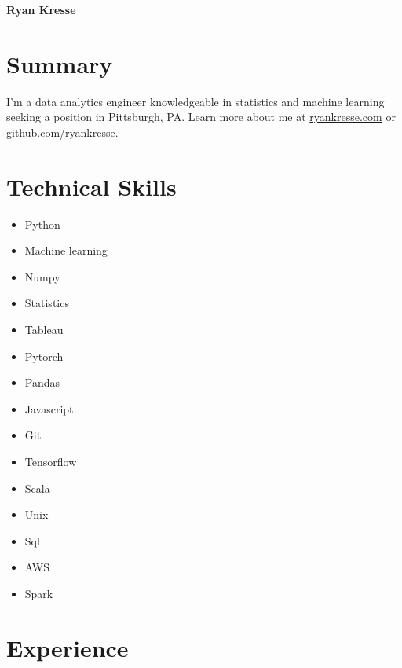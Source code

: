 \documentclass[11pt]{article}
\begin{document}
	\noindent \textbf{{\fontsize{38pt}{\parskip}\selectfont \color{RyanRed} Ryan Kresse}}
	\smallskip


	\section{Summary}
	I'm a data analytics engineer knowledgeable in statistics and machine learning seeking a position in Pittsburgh, PA. Learn more about me at \href{http://ryankresse.com/blog}{ryankresse.com} or \href{https://github.com/ryankresse}{github.com/ryankresse}.
	\section{Technical Skills}
		\begin{multicols}{4}
			\begin{itemize}
				\item Python
				\item Machine learning
				\item Numpy

				\columnbreak
				\item Statistics
				\item Tableau
				\item Pytorch
				\item Pandas

				\columnbreak
				\item Javascript
				\item Git
				\item Tensorflow
				\item Scala

				\columnbreak
				\item Unix
				\item Sql
				\item AWS
				\item Spark

				\columnbreak

			\end{itemize}
		\end{multicols}



	\section{Experience}
\end{document}
